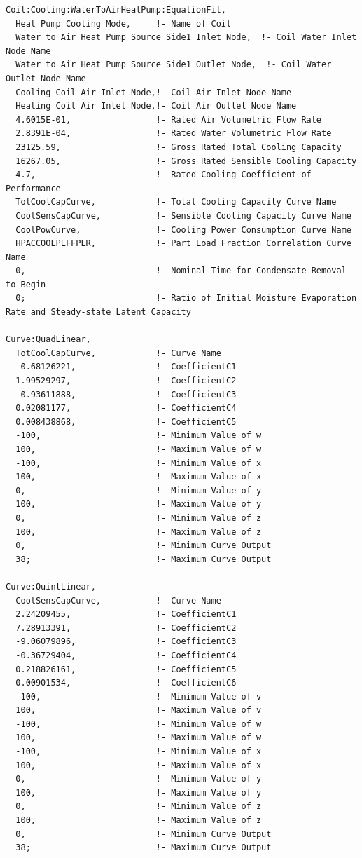 \begin{lstlisting}
Coil:Cooling:WaterToAirHeatPump:EquationFit,
  Heat Pump Cooling Mode,     !- Name of Coil
  Water to Air Heat Pump Source Side1 Inlet Node,  !- Coil Water Inlet Node Name
  Water to Air Heat Pump Source Side1 Outlet Node,  !- Coil Water Outlet Node Name
  Cooling Coil Air Inlet Node,!- Coil Air Inlet Node Name
  Heating Coil Air Inlet Node,!- Coil Air Outlet Node Name
  4.6015E-01,                 !- Rated Air Volumetric Flow Rate
  2.8391E-04,                 !- Rated Water Volumetric Flow Rate
  23125.59,                   !- Gross Rated Total Cooling Capacity
  16267.05,                   !- Gross Rated Sensible Cooling Capacity
  4.7,                        !- Rated Cooling Coefficient of Performance
  TotCoolCapCurve,            !- Total Cooling Capacity Curve Name
  CoolSensCapCurve,           !- Sensible Cooling Capacity Curve Name
  CoolPowCurve,               !- Cooling Power Consumption Curve Name
  HPACCOOLPLFFPLR,            !- Part Load Fraction Correlation Curve Name
  0,                          !- Nominal Time for Condensate Removal to Begin
  0;                          !- Ratio of Initial Moisture Evaporation Rate and Steady-state Latent Capacity

Curve:QuadLinear,
  TotCoolCapCurve,            !- Curve Name
  -0.68126221,                !- CoefficientC1
  1.99529297,                 !- CoefficientC2
  -0.93611888,                !- CoefficientC3
  0.02081177,                 !- CoefficientC4
  0.008438868,                !- CoefficientC5
  -100,                       !- Minimum Value of w
  100,                        !- Maximum Value of w
  -100,                       !- Minimum Value of x
  100,                        !- Maximum Value of x
  0,                          !- Minimum Value of y
  100,                        !- Maximum Value of y
  0,                          !- Minimum Value of z
  100,                        !- Maximum Value of z
  0,                          !- Minimum Curve Output
  38;                         !- Maximum Curve Output

Curve:QuintLinear,
  CoolSensCapCurve,           !- Curve Name
  2.24209455,                 !- CoefficientC1
  7.28913391,                 !- CoefficientC2
  -9.06079896,                !- CoefficientC3
  -0.36729404,                !- CoefficientC4
  0.218826161,                !- CoefficientC5
  0.00901534,                 !- CoefficientC6
  -100,                       !- Minimum Value of v
  100,                        !- Maximum Value of v
  -100,                       !- Minimum Value of w
  100,                        !- Maximum Value of w
  -100,                       !- Minimum Value of x
  100,                        !- Maximum Value of x
  0,                          !- Minimum Value of y
  100,                        !- Maximum Value of y
  0,                          !- Minimum Value of z
  100,                        !- Maximum Value of z
  0,                          !- Minimum Curve Output
  38;                         !- Maximum Curve Output


\end{lstlisting}
